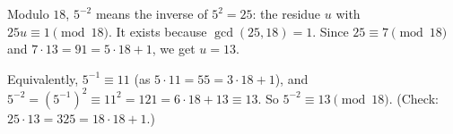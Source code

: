 Modulo $18$, $5^{-2}$ means the inverse of $5^2=25$: the residue $u$ with $25u\equiv1\pmod{18}$. It exists because $\gcd(25,18)=1$. Since $25\equiv7\pmod{18}$ and $7\cdot13=91=5\cdot18+1$, we get $u=13$.

Equivalently, $5^{-1}\equiv11$ (as $5\cdot11=55=3\cdot18+1$), and $5^{-2}=\left(5^{-1}\right)^2\equiv11^2=121=6\cdot18+13\equiv13$. So $5^{-2}\equiv\boxed{13}\pmod{18}$. (Check: $25\cdot13=325=18\cdot18+1$.)
